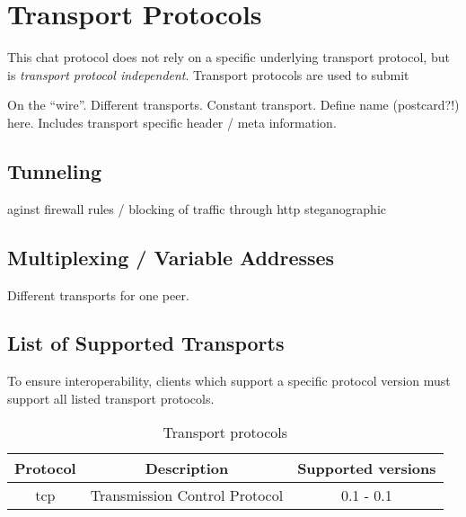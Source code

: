 \section{Transport Protocols}
This chat protocol does not rely on a specific underlying transport protocol,
but is \textit{transport protocol independent}. Transport protocols are used
to submit 


On the "`wire"'. Different transports. Constant transport.
Define name (postcard?!) here. Includes transport specific
header / meta information.

\subsection{Tunneling}
\label{tunneling}
aginst firewall rules / blocking of traffic
through http
steganographic

\subsection{Multiplexing / Variable Addresses}
\label{multiplexing}
Different transports for one peer.

\subsection{List of Supported Transports}
To ensure interoperability, clients which support a specific
protocol version must support all listed transport protocols.
\begin{longtable}{|c|c|c|}
\caption{Transport protocols}\\
\hline
\textbf{Protocol} & \textbf{Description} & \textbf{Supported versions}\\
\hline
tcp & Transmission Control Protocol & 0.1 - 0.1\\
\hline
\end{longtable}


